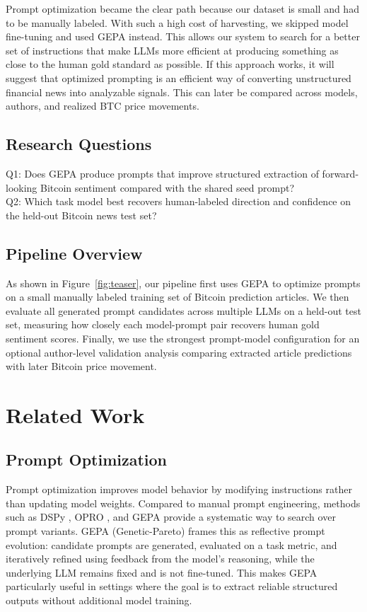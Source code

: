 \documentclass[sigconf,screen]{acmart}
\begin{document}
Prompt optimization became the clear path because our dataset is small and had to be manually labeled. With such a high cost of harvesting, we skipped model fine-tuning and used GEPA instead. This allows our system to search for a better set of instructions that make LLMs more efficient at producing something as close to the human gold standard as possible. If this approach works, it will suggest that optimized prompting is an efficient way of converting unstructured financial news into analyzable signals. This can later be compared across models, authors, and realized BTC price movements.

\subsection{Research Questions}
Q1: Does GEPA produce prompts that improve structured extraction of
forward-looking Bitcoin sentiment compared with the shared seed prompt? \\
Q2: Which task model best recovers human-labeled direction and confidence on
the held-out Bitcoin news test set?

\subsection{Pipeline Overview}
As shown in Figure~\ref{fig:teaser}, our pipeline first uses GEPA to optimize
prompts on a small manually labeled training set of Bitcoin prediction
articles. We then evaluate all generated prompt candidates across multiple
LLMs on a held-out test set, measuring how closely each model-prompt pair
recovers human gold sentiment scores. Finally, we use the strongest
prompt-model configuration for an optional author-level validation analysis
comparing extracted article predictions with later Bitcoin price movement.

\section{Related Work}

\subsection{Prompt Optimization}
Prompt optimization improves model behavior by modifying instructions rather
than updating model weights. Compared to manual prompt engineering, methods
such as DSPy \cite{khattab2023dspycompilingdeclarativelanguage}, OPRO
\cite{yang2024largelanguagemodelsoptimizers}, and GEPA
\cite{agrawal2026gepa} provide a systematic way to search over prompt
variants. GEPA (Genetic-Pareto) frames this as reflective prompt evolution:
candidate prompts are generated, evaluated on a task metric, and iteratively
refined using feedback from the model's reasoning, while the underlying LLM
remains fixed and is not fine-tuned. This makes GEPA
particularly useful in settings where the goal is to extract reliable
structured outputs without additional model training.
\end{document}
